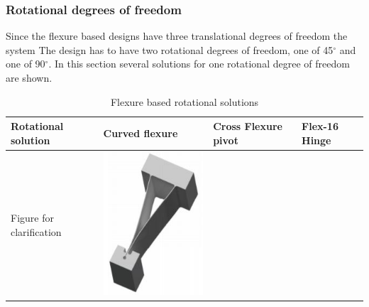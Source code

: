 \subsubsection{Rotational degrees of freedom}
Since the flexure based designs have three translational degrees of freedom the system
The design has to have two rotational degrees of freedom, one of 45$^{\circ}$ and one of 90$^{\circ}$. In this section several solutions for one rotational degree of freedom are shown.

\begin{table}[h]
\caption{Flexure based rotational solutions}
\label{Tab: flexure rotational}
\begin{tabular}{p{4cm}|p{4cm}p{4cm}p{4cm}}
Rotational solution   &  Curved flexure \cite{BrouwerELASTICDEFLECTION}   & Cross Flexure pivot \cite{Dearden2018CylindricalPivots} & Flex-16 Hinge \cite{Fowler2014Flex-16:Citation} \\ \hline
Figure for clarification &     
    \begin{minipage}{4cm}
      \includegraphics[width=\linewidth]{images/Cross_Brouwer.JPG}

\end{minipage}
\end{tabular}
\end{table}

